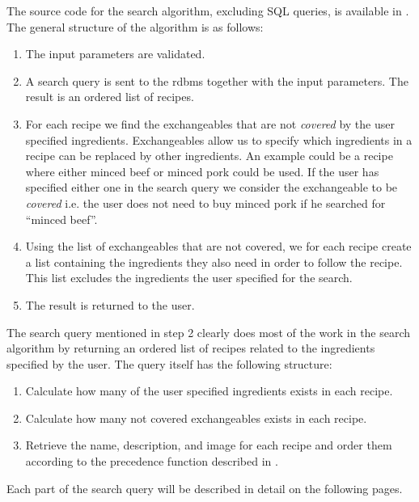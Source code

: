 The source code for the search algorithm, excluding SQL queries, is available in . The general structure of the algorithm is as follows:
\begin{enumerate}
\item The input parameters are validated.
\item A search query is sent to the \ac{rdbms} together with the input parameters. The result is an ordered list of recipes.
\item For each recipe we find the exchangeables that are not \textit{covered} by the user specified ingredients. Exchangeables allow us to specify which ingredients in a recipe can be replaced by other ingredients. An example could be a recipe where either minced beef or minced pork could be used. If the user has specified either one in the search query we consider the exchangeable to be \textit{covered} i.e. the user does not need to buy minced pork if he searched for ``minced beef''.
\item Using the list of exchangeables that are not covered, we for each recipe create a list containing the ingredients they also need in order to follow the recipe. This list excludes the ingredients the user specified for the search.
\item The result is returned to the user.
\end{enumerate}

The search query mentioned in step 2 clearly does most of the work in the search algorithm by returning an ordered list of recipes related to the ingredients specified by the user. The query itself has the following structure:
\begin{enumerate}
\item Calculate how many of the user specified ingredients exists in each recipe.
\item Calculate how many not covered exchangeables exists in each recipe.
\item Retrieve the name, description, and image for each recipe and order them according to the precedence function described in .
\end{enumerate}

Each part of the search query will be described in detail on the following pages.


